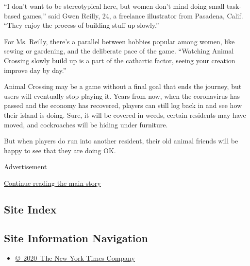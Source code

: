 ``I don't want to be stereotypical here, but women don't mind doing
small task-based games,'' said Gwen Reilly, 24, a freelance illustrator
from Pasadena, Calif. ``They enjoy the process of building stuff up
slowly.''

For Ms. Reilly, there's a parallel between hobbies popular among women,
like sewing or gardening, and the deliberate pace of the game.
``Watching Animal Crossing slowly build up is a part of the cathartic
factor, seeing your creation improve day by day.''

Animal Crossing may be a game without a final goal that ends the
journey, but users will eventually stop playing it. Years from now, when
the coronavirus has passed and the economy has recovered, players can
still log back in and see how their island is doing. Sure, it will be
covered in weeds, certain residents may have moved, and cockroaches will
be hiding under furniture.

But when players do run into another resident, their old animal friends
will be happy to see that they are doing OK.

Advertisement

\protect\hyperlink{after-bottom}{Continue reading the main story}

\hypertarget{site-index}{%
\subsection{Site Index}\label{site-index}}

\hypertarget{site-information-navigation}{%
\subsection{Site Information
Navigation}\label{site-information-navigation}}

\begin{itemize}
\tightlist
\item
  \href{https://help.nytimes3xbfgragh.onion/hc/en-us/articles/115014792127-Copyright-notice}{©~2020~The
  New York Times Company}
\end{itemize}

